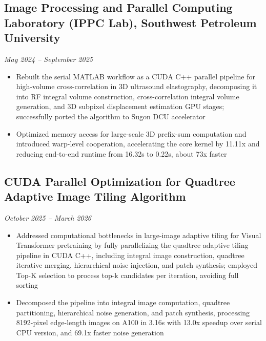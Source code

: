 \documentclass{resume}
\begin{document}
\subsection{\textbf{Image Processing and Parallel Computing Laboratory (IPPC Lab)}, Southwest Petroleum University}
\textit{May 2024 -- September 2025}
\begin{itemize}
  \item Rebuilt the serial MATLAB workflow as a CUDA C++ parallel pipeline for high-volume cross-correlation in 3D ultrasound elastography, decomposing it into RF integral volume construction, cross-correlation integral volume generation, and 3D subpixel displacement estimation GPU stages; successfully ported the algorithm to Sugon DCU accelerator
  \item Optimized memory access for large-scale 3D prefix-sum computation and introduced warp-level cooperation, accelerating the core kernel by 11.11x and reducing end-to-end runtime from 16.32s to 0.22s, about 73x faster
\end{itemize}

\subsection{\textbf{CUDA Parallel Optimization for Quadtree Adaptive Image Tiling Algorithm}}
\textit{October 2025 -- March 2026}
\begin{itemize}
  \item Addressed computational bottlenecks in large-image adaptive tiling for Visual Transformer pretraining by fully parallelizing the quadtree adaptive tiling pipeline in CUDA C++, including integral image construction, quadtree iterative merging, hierarchical noise injection, and patch synthesis; employed Top-K selection to process top-k candidates per iteration, avoiding full sorting
  \item Decomposed the pipeline into integral image computation, quadtree partitioning, hierarchical noise generation, and patch synthesis, processing 8192-pixel edge-length images on A100 in 3.16s with 13.0x speedup over serial CPU version, and 69.1x faster noise generation
\end{itemize}
\end{document}
